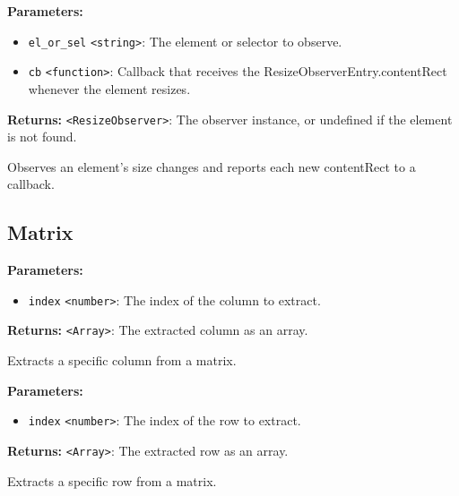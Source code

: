\documentclass[12pt,a4paper]{article}
\begin{document}
\noindent \textbf{Parameters:}
\begin{itemize}
  \item \texttt{el\_or\_sel} \texttt{<string>}: The element or selector to observe.
  \item \texttt{cb} \texttt{<function>}: Callback that receives the \textasciigrave{}ResizeObserverEntry.contentRect\textasciigrave{} whenever the element resizes.
\end{itemize}

\noindent \textbf{Returns:} \texttt{<ResizeObserver>}: The observer instance, or \textasciigrave{}undefined\textasciigrave{} if the element is not found.

\noindent Observes an element’s size changes and reports each new \textasciigrave{}contentRect\textasciigrave{} to a callback.


\subsection{Matrix}
\vspace{5mm}
\noindent {}


\noindent \textbf{Parameters:}
\begin{itemize}
  \item \texttt{index} \texttt{<number>}: The index of the column to extract.
\end{itemize}

\noindent \textbf{Returns:} \texttt{<Array>}: The extracted column as an array.

\noindent Extracts a specific column from a matrix.

\vspace{5mm}
\noindent {}


\noindent \textbf{Parameters:}
\begin{itemize}
  \item \texttt{index} \texttt{<number>}: The index of the row to extract.
\end{itemize}

\noindent \textbf{Returns:} \texttt{<Array>}: The extracted row as an array.

\noindent Extracts a specific row from a matrix.
\end{document}
